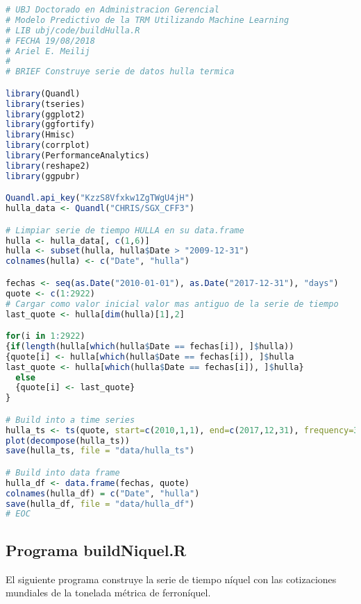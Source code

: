 \begin{lstlisting}[language=R]
# UBJ Doctorado en Administracion Gerencial
# Modelo Predictivo de la TRM Utilizando Machine Learning
# LIB ubj/code/buildHulla.R
# FECHA 19/08/2018
# Ariel E. Meilij
#
# BRIEF Construye serie de datos hulla termica

library(Quandl)
library(tseries)
library(ggplot2)
library(ggfortify)
library(Hmisc)
library(corrplot)
library(PerformanceAnalytics)
library(reshape2)
library(ggpubr)

Quandl.api_key("KzzS8Vfxkw1ZgTWgU4jH")
hulla_data <- Quandl("CHRIS/SGX_CFF3")

# Limpiar serie de tiempo HULLA en su data.frame
hulla <- hulla_data[, c(1,6)]
hulla <- subset(hulla, hulla$Date > "2009-12-31")
colnames(hulla) <- c("Date", "hulla")

fechas <- seq(as.Date("2010-01-01"), as.Date("2017-12-31"), "days")
quote <- c(1:2922)
# Cargar como valor inicial valor mas antiguo de la serie de tiempo
last_quote <- hulla[dim(hulla)[1],2]

for(i in 1:2922)
{if(length(hulla[which(hulla$Date == fechas[i]), ]$hulla))
{quote[i] <- hulla[which(hulla$Date == fechas[i]), ]$hulla
last_quote <- hulla[which(hulla$Date == fechas[i]), ]$hulla}
  else
  {quote[i] <- last_quote}
}

# Build into a time series
hulla_ts <- ts(quote, start=c(2010,1,1), end=c(2017,12,31), frequency=365)
plot(decompose(hulla_ts))
save(hulla_ts, file = "data/hulla_ts")

# Build into data frame
hulla_df <- data.frame(fechas, quote)
colnames(hulla_df) = c("Date", "hulla")
save(hulla_df, file = "data/hulla_df")
# EOC
\end{lstlisting}

\subsection{Programa buildNiquel.R}
El siguiente programa construye la serie de tiempo níquel con las cotizaciones mundiales de la tonelada métrica de ferroníquel.

